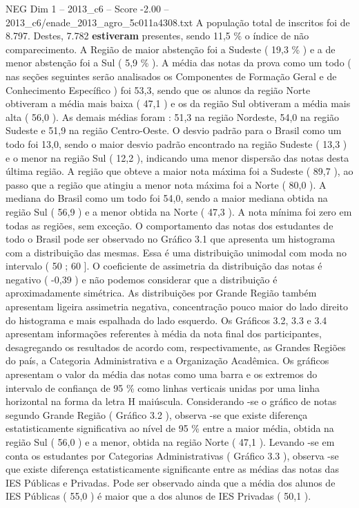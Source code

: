 \begin{textsample}{NEG Dim 1 – 2013\_c6 – Score -2.00 – 2013\_c6/enade\_2013\_agro\_5c011a4308.txt}
A população total de inscritos foi de 8.797.
Destes, 7.782 \textbf{estiveram} presentes, sendo 11,5 \% o índice de não comparecimento.
A Região de maior abstenção foi a Sudeste ( 19,3 \% ) e a de menor abstenção foi a Sul ( 5,9 \% ).
A média das notas da prova como um todo ( nas seções seguintes serão analisados os Componentes de Formação Geral e de Conhecimento Específico ) foi 53,3, sendo que os alunos da região Norte obtiveram a média mais baixa ( 47,1 ) e os da região Sul obtiveram a média mais alta ( 56,0 ).
As demais médias foram : 51,3 na região Nordeste, 54,0 na região Sudeste e 51,9 na região Centro-Oeste.
O desvio padrão para o Brasil como um todo foi 13,0, sendo o maior desvio padrão encontrado na região Sudeste ( 13,3 ) e o menor na região Sul ( 12,2 ), indicando uma menor dispersão das notas desta última região.
A região que obteve a maior nota máxima foi a Sudeste ( 89,7 ), ao passo que a região que atingiu a menor nota máxima foi a Norte ( 80,0 ).
A mediana do Brasil como um todo foi 54,0, sendo a maior mediana obtida na região Sul ( 56,9 ) e a menor obtida na Norte ( 47,3 ).
A nota mínima foi zero em todas as regiões, sem exceção.
O comportamento das notas dos estudantes de todo o Brasil pode ser observado no Gráfico 3.1 que apresenta um histograma com a distribuição das mesmas.
Essa é uma distribuição unimodal com moda no intervalo ( 50 ; 60 ].
O coeficiente de assimetria da distribuição das notas é negativo ( -0,39 ) e não podemos considerar que a distribuição é aproximadamente simétrica.
As distribuições por Grande Região também apresentam ligeira assimetria negativa, concentração pouco maior do lado direito do histograma e mais espalhada do lado esquerdo.
Os Gráficos 3.2, 3.3 e 3.4 apresentam informações referentes à média da nota final dos participantes, desagregando os resultados de acordo com, respectivamente, as Grandes Regiões do país, a Categoria Administrativa e a Organização Acadêmica.
Os gráficos apresentam o valor da média das notas como uma barra e os extremos do intervalo de confiança de 95 \% como linhas verticais unidas por uma linha horizontal na forma da letra H maiúscula.
Considerando -se o gráfico de notas segundo Grande Região ( Gráfico 3.2 ), observa -se que existe diferença estatisticamente significativa ao nível de 95 \% entre a maior média, obtida na região Sul ( 56,0 ) e a menor, obtida na região Norte ( 47,1 ).
Levando -se em conta os estudantes por Categorias Administrativas ( Gráfico 3.3 ), observa -se que existe diferença estatisticamente significante entre as médias das notas das IES Públicas e Privadas.
Pode ser observado ainda que a média dos alunos de IES Públicas ( 55,0 ) é maior que a dos alunos de IES Privadas ( 50,1 ).

\end{textsample}
